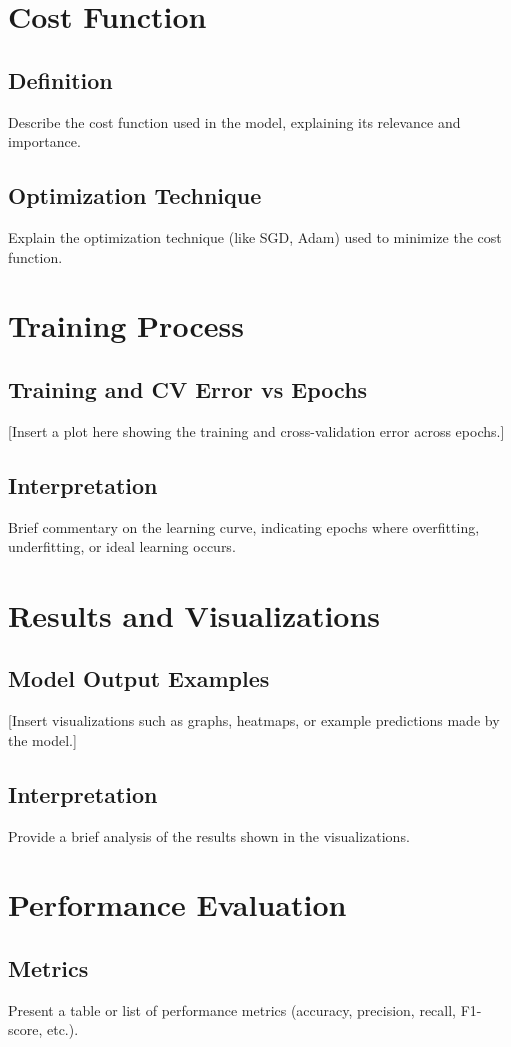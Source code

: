 \documentclass[review,onefignum,onetabnum,twoside]{siamart220329}
\begin{document}
\section{Cost Function}
\subsection{Definition}
Describe the cost function used in the model, explaining its relevance and importance.
\subsection{Optimization Technique}
Explain the optimization technique (like SGD, Adam) used to minimize the cost function.

\section{Training Process}
\subsection{Training and CV Error vs Epochs}
[Insert a plot here showing the training and cross-validation error across epochs.]
\subsection{Interpretation}
Brief commentary on the learning curve, indicating epochs where overfitting, underfitting, or ideal learning occurs.

\section{Results and Visualizations}
\subsection{Model Output Examples}
[Insert visualizations such as graphs, heatmaps, or example predictions made by the model.]
\subsection{Interpretation}
Provide a brief analysis of the results shown in the visualizations.

\section{Performance Evaluation}
\subsection{Metrics}
Present a table or list of performance metrics (accuracy, precision, recall, F1-score, etc.).
\end{document}
